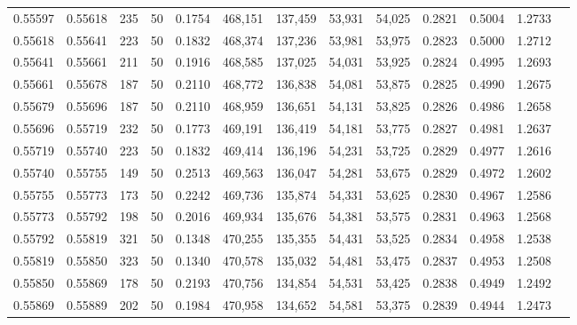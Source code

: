 \begin{tabular}{rrrrrrrrrrrrr}
0.55597 & 0.55618 &   235 &  50 &                                     0.1754 & 468,151 & 137,459 &  53,931 &  54,025 & 0.2821 & 0.5004 & 1.2733 \\
0.55618 & 0.55641 &   223 &  50 &                                     0.1832 & 468,374 & 137,236 &  53,981 &  53,975 & 0.2823 & 0.5000 & 1.2712 \\
0.55641 & 0.55661 &   211 &  50 &                                     0.1916 & 468,585 & 137,025 &  54,031 &  53,925 & 0.2824 & 0.4995 & 1.2693 \\
0.55661 & 0.55678 &   187 &  50 &                                     0.2110 & 468,772 & 136,838 &  54,081 &  53,875 & 0.2825 & 0.4990 & 1.2675 \\
0.55679 & 0.55696 &   187 &  50 &                                     0.2110 & 468,959 & 136,651 &  54,131 &  53,825 & 0.2826 & 0.4986 & 1.2658 \\
0.55696 & 0.55719 &   232 &  50 &                                     0.1773 & 469,191 & 136,419 &  54,181 &  53,775 & 0.2827 & 0.4981 & 1.2637 \\
0.55719 & 0.55740 &   223 &  50 &                                     0.1832 & 469,414 & 136,196 &  54,231 &  53,725 & 0.2829 & 0.4977 & 1.2616 \\
0.55740 & 0.55755 &   149 &  50 &                                     0.2513 & 469,563 & 136,047 &  54,281 &  53,675 & 0.2829 & 0.4972 & 1.2602 \\
0.55755 & 0.55773 &   173 &  50 &                                     0.2242 & 469,736 & 135,874 &  54,331 &  53,625 & 0.2830 & 0.4967 & 1.2586 \\
0.55773 & 0.55792 &   198 &  50 &                                     0.2016 & 469,934 & 135,676 &  54,381 &  53,575 & 0.2831 & 0.4963 & 1.2568 \\
0.55792 & 0.55819 &   321 &  50 &                                     0.1348 & 470,255 & 135,355 &  54,431 &  53,525 & 0.2834 & 0.4958 & 1.2538 \\
0.55819 & 0.55850 &   323 &  50 &                                     0.1340 & 470,578 & 135,032 &  54,481 &  53,475 & 0.2837 & 0.4953 & 1.2508 \\
0.55850 & 0.55869 &   178 &  50 &                                     0.2193 & 470,756 & 134,854 &  54,531 &  53,425 & 0.2838 & 0.4949 & 1.2492 \\
0.55869 & 0.55889 &   202 &  50 &                                     0.1984 & 470,958 & 134,652 &  54,581 &  53,375 & 0.2839 & 0.4944 & 1.2473 \\

\end{tabular}
